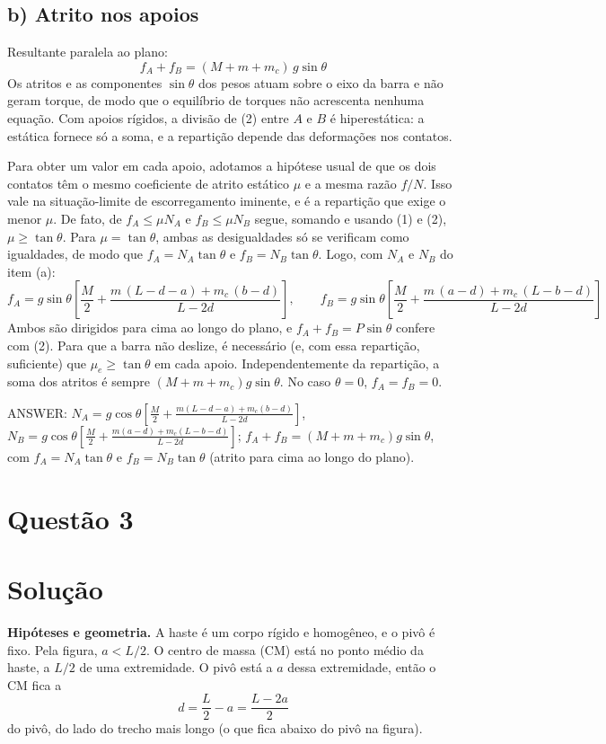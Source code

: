 \documentclass{article}%
\begin{document}
\subsection*{b) Atrito nos apoios}

Resultante paralela ao plano:
\[
\boxed{f_A+f_B=(M+m+m_c)\,g\sin\theta}\tag{2}
\]
Os atritos e as componentes $\sin\theta$ dos pesos atuam sobre o eixo da barra e não geram torque, de modo que o equilíbrio de torques não acrescenta nenhuma equação. Com apoios rígidos, a divisão de (2) entre $A$ e $B$ é hiperestática: a estática fornece só a soma, e a repartição depende das deformações nos contatos.

Para obter um valor em cada apoio, adotamos a hipótese usual de que os dois contatos têm o mesmo coeficiente de atrito estático $\mu$ e a mesma razão $f/N$. Isso vale na situação-limite de escorregamento iminente, e é a repartição que exige o menor $\mu$. De fato, de $f_A\le\mu N_A$ e $f_B\le\mu N_B$ segue, somando e usando (1) e (2), $\mu\ge\tan\theta$. Para $\mu=\tan\theta$, ambas as desigualdades só se verificam como igualdades, de modo que $f_A=N_A\tan\theta$ e $f_B=N_B\tan\theta$. Logo, com $N_A$ e $N_B$ do item (a):
\[
\boxed{f_A=g\sin\theta\left[\frac M2+\frac{m\,(L-d-a)+m_c\,(b-d)}{L-2d}\right]},\qquad
\boxed{f_B=g\sin\theta\left[\frac M2+\frac{m\,(a-d)+m_c\,(L-b-d)}{L-2d}\right]}
\]
Ambos são dirigidos para cima ao longo do plano, e $f_A+f_B=P\sin\theta$ confere com (2). Para que a barra não deslize, é necessário (e, com essa repartição, suficiente) que $\mu_e\ge\tan\theta$ em cada apoio. Independentemente da repartição, a soma dos atritos é sempre $(M+m+m_c)g\sin\theta$. No caso $\theta=0$, $f_A=f_B=0$.

\medskip
\noindent ANSWER: $N_A=g\cos\theta\left[\frac M2+\frac{m(L-d-a)+m_c(b-d)}{L-2d}\right]$, $N_B=g\cos\theta\left[\frac M2+\frac{m(a-d)+m_c(L-b-d)}{L-2d}\right]$; $f_A+f_B=(M+m+m_c)g\sin\theta$, com $f_A=N_A\tan\theta$ e $f_B=N_B\tan\theta$ (atrito para cima ao longo do plano).%
\newpage%
\section*{Questão 3}

\section*{Solução}

\textbf{Hipóteses e geometria.} A haste é um corpo rígido e homogêneo, e o pivô é fixo. Pela figura, $a<L/2$. O centro de massa (CM) está no ponto médio da haste, a $L/2$ de uma extremidade. O pivô está a $a$ dessa extremidade, então o CM fica a
\[
d=\frac{L}{2}-a=\frac{L-2a}{2}
\]
do pivô, do lado do trecho mais longo (o que fica abaixo do pivô na figura).
\end{document}
